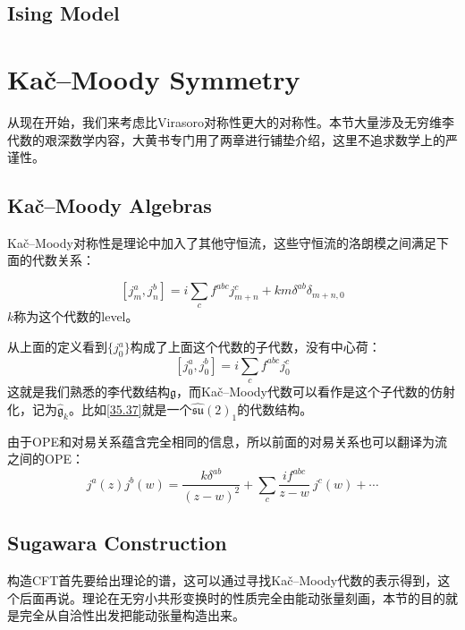 \subsection{Ising Model}

\section{Ka\v{c}\mbox{–}Moody Symmetry}
从现在开始，我们来考虑比Virasoro对称性更大的对称性。本节大量涉及无穷维李代数的艰深数学内容，大黄书专门用了两章进行铺垫介绍，这里不追求数学上的严谨性。
\subsection{Ka\v{c}\mbox{–}Moody Algebras}
Ka\v{c}\mbox{–}Moody对称性是理论中加入了其他守恒流，这些守恒流的洛朗模之间满足下面的代数关系：
\begin{definition}
	\begin{equation}\label{38.1}
		\boxed{
			\left[j_m^a,j_n^b\right]=i\sum_cf^{abc}j_{m+n}^c+k m\delta^{ab}\delta_{m+n,0}
		}
	\end{equation}
	$k$称为这个代数的level。
\end{definition}
从上面的定义看到$\{j_0^a\}$构成了上面这个代数的子代数，没有中心荷：
\begin{equation}\label{38.2}
	\left[j_0^a,j_0^b\right]=i\sum_cf^{abc}j_0^c
\end{equation}
这就是我们熟悉的李代数结构$\mathfrak{g}$，而Ka\v{c}\mbox{–}Moody代数可以看作是这个子代数的仿射化，记为$\hat{\mathfrak{g}}_k$。比如\ref{35.37}就是一个$\widehat{\mathfrak{su}}(2)_{1}$的代数结构。
\begin{theorem}
	由于OPE和对易关系蕴含完全相同的信息，所以前面的对易关系也可以翻译为流之间的OPE：
	\begin{equation}\label{38.3}
		\boxed{
			j^a(z)j^b(w)=\frac {k\delta^{ab}}{(z-w)^2}+\sum_c\frac{if^{abc}}{z-w}~j^c(w)+\cdots 
		}
	\end{equation}
\end{theorem}

\subsection{Sugawara Construction}
构造CFT首先要给出理论的谱，这可以通过寻找Ka\v{c}\mbox{–}Moody代数的表示得到，这个后面再说。理论在无穷小共形变换时的性质完全由能动张量刻画，本节的目的就是完全从自洽性出发把能动张量构造出来。

